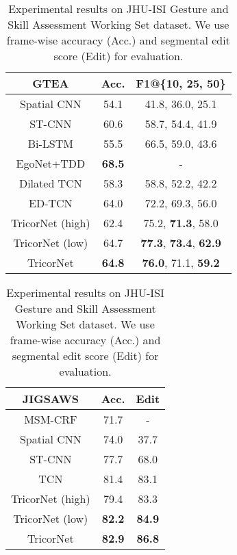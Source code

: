 \documentclass{article}
\begin{document}
\begin{table}
	\parbox[t]{.52\linewidth}{
		\centering
		\caption{Experimental results on Georgia Tech Egocentric Activities dataset. We use frame-wise accuracy (Acc.) and overlap F1 score with thresholds (F1@10,25,50) for evaluation.}
		\label{gtea}
		\begin{tabular}{|c|c|c|}
			\hline
			\textbf{GTEA}        & \textbf{Acc.} & \textbf{F1@\{10, 25, 50\}} \\ \hline
			Spatial CNN \cite{scnn} & 54.1              & 41.8, 36.0, 25.1                \\
			ST-CNN \cite{scnn}      & 60.6              & 58.7, 54.4, 41.9                \\
			Bi-LSTM      & 55.5              & 66.5, 59.0, 43.6                \\
			EgoNet+TDD \cite{ego}  & \textbf{68.5}              & -                   \\
			Dilated TCN \cite{LeFlViCVPR2017} & 58.3              & 58.8, 52.2, 42.2                \\
			ED-TCN \cite{LeFlViCVPR2017}      & 64.0              & 72.2, 69.3, 56.0                \\ \hline
			TricorNet (high)                & 62.4              & 75.2, \textbf{71.3}, 58.0              \\
			TricorNet (low)                & 64.7              & \textbf{77.3}, \textbf{73.4}, \textbf{62.9}              \\
			TricorNet                 & \textbf{64.8}              & \textbf{76.0}, 71.1, \textbf{59.2}             \\
			\hline
		\end{tabular}
	}
	\hfill
	\parbox[t]{.41\linewidth}{
		\centering
		\caption{Experimental results on JHU-ISI Gesture and Skill Assessment Working Set dataset. We use frame-wise accuracy (Acc.) and segmental edit score (Edit) for evaluation.}
		\label{jigsaws}
		\begin{tabular}{|c|c|c|}
			\hline
			\textbf{JIGSAWS}     & \textbf{Acc.} & \textbf{Edit} \\ \hline
			MSM-CRF \cite{tao}   & 71.7              & -                   \\
			Spatial CNN \cite{scnn} & 74.0              & 37.7                \\
			ST-CNN \cite{scnn}      & 77.7              & 68.0                \\
			TCN \cite{tcnw}         & 81.4              & 83.1                \\ \hline
			TricorNet (high)                & 79.4              & 83.3               \\
			TricorNet (low)                & \textbf{82.2}              & \textbf{84.9}               \\
			TricorNet                 & \textbf{82.9}              & \textbf{86.8}               \\
			\hline
		\end{tabular}
	}
\end{table}
\end{document}

